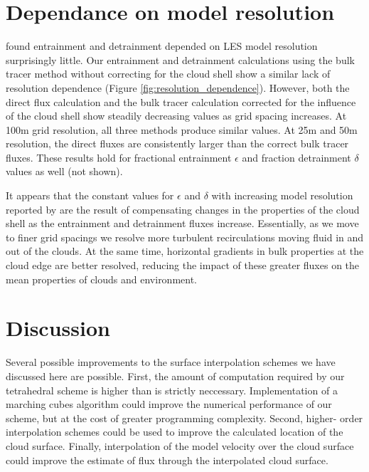 \documentclass[12pt]{article}
\begin{document}

\section{Dependance on model resolution}

\cite{Brown1999} found entrainment and detrainment depended on LES model 
resolution surprisingly little.  Our entrainment and detrainment calculations 
using the bulk tracer method without correcting for the cloud shell show a
similar lack of resolution dependence (Figure \ref{fig:resolution_dependence}).
However, both the direct flux calculation and the bulk tracer calculation 
corrected for the influence of the cloud shell show steadily decreasing values 
as grid spacing increases.  At 100m grid resolution, all three methods produce
similar values.  At 25m and 50m resolution, the direct fluxes are consistently 
larger than the correct bulk tracer fluxes.  These results hold for fractional
entrainment $\epsilon$ and fraction detrainment $\delta$ values as well (not
shown).  

It appears that the constant values for $\epsilon$ and $\delta$ with increasing
model resolution reported by \cite{Brown1999} are the result of compensating
changes in the properties of the cloud shell as the entrainment and detrainment
fluxes increase.  Essentially, as we move to finer grid spacings we resolve
more turbulent recirculations moving fluid in and out of the clouds.  At the
same time, horizontal gradients in bulk properties at the cloud edge are better
resolved, reducing the impact of these greater fluxes on the mean properties of 
clouds and environment.


\section{Discussion}

Several possible improvements to the surface interpolation schemes we have 
discussed here are possible.  First, the amount of computation required by our 
tetrahedral scheme is higher than is strictly neccessary.  Implementation
of a marching cubes algorithm could improve the numerical performance of our
scheme, but at the cost of greater programming complexity.  Second, higher-
order interpolation schemes could be used to improve the calculated location of
the cloud surface.  Finally, interpolation of the model velocity over the
cloud surface could improve the estimate of flux through the interpolated cloud
surface.
\end{document}
